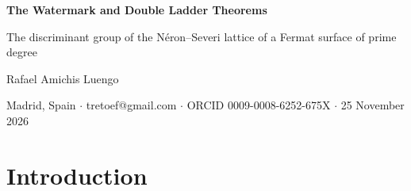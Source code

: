 \documentclass[11pt]{article}
\theoremstyle{definition}
\theoremstyle{remark}
\newcommand{\Z}{\mathbb{Z}}
\newcommand{\F}{\mathbb{F}}
\newcommand{\Pp}{\mathbb{P}}
\newcommand{\NS}{\operatorname{NS}}
\begin{document}
\begin{center}
{\LARGE\bfseries The Watermark and Double Ladder Theorems\par}
\medskip
{\large The discriminant group of the N\'eron--Severi lattice of a Fermat surface of prime degree\par}
\bigskip
{\large Rafael Amichis Luengo\par}
\smallskip
{\small Madrid, Spain $\cdot$ tretoef@gmail.com $\cdot$ ORCID 0009-0008-6252-675X $\cdot$ 25 November 2026\par}
\end{center}

\begin{abstract}
Let $S_p\subset\Pp^3$ be the complex Fermat surface $x_0^p+x_1^p+x_2^p+x_3^p=0$ of prime degree $p\ge 5$. Its N\'eron--Severi lattice $\NS(S_p)$ is generated by the classes of the $3p^2$ lines on $S_p$ (Sch\"utt--Shioda--van Luijk, Degtyarev). We prove that
\[
|\operatorname{disc}\NS(S_p)| = p^{3(p-3)^2}\qquad\text{(the Watermark Theorem)},
\]
which answers formula (7.10) of Shioda's Question~7.4 (1987) for every prime $p\ge5$, and we determine the discriminant group itself:
\[
\NS(S_p)^\ast/\NS(S_p)\;\cong\;\begin{cases}(\Z/p)^{3p^2-24p+59}\times(\Z/p^2)^{3p-16}, & p\ge 7,\\ (\Z/5)^{10}\times\Z/25, & p=5\end{cases}
\]
(the Double Ladder Theorem). The transcendental lattice of $S_p$ has the same discriminant group. The proofs work with the explicit integer intersection matrix $G$ of the lines and use elementary lattice arithmetic. For the order, $G$ acts by multiples of $p$ on functions pulled back along the $p+1$ pencils of parallel lines of $\F_p^2$, its kernel contains an explicit sublattice of index $p^{12}$, and two index computations conclude. For the group, an identity $GYG=6p^2G$ with an explicit integer matrix $Y$ bounds the exponent by $p^2$, and $G$ modulo $p$ factors through twelve functions of one variable, which gives its rank $12(p-3)$ ($26$ at $p=5$). On the level $\nu\le3$ of a filtration by vanishing moments of degree $<\nu$, the rank of the form modulo $p$ is $12(p-3)-3\nu(\nu+1)$ for $p\ge7$; this is not needed in the proofs. The lattice statements of both theorems are checked in Lean~4 with Mathlib; the identification of $G$ with the intersection matrix of the lines is proved by hand.
\end{abstract}

\section{Introduction}
\end{document}
